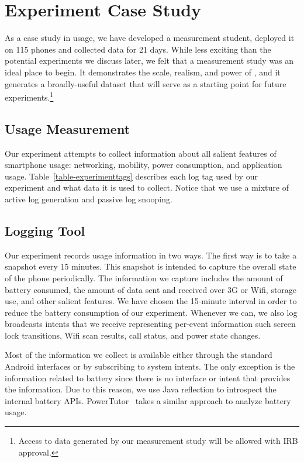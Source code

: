 \section{Experiment Case Study}
\label{sec-experiment}

As a case study in \PhoneLab{} usage, we have developed a measurement
student, deployed it on 115 phones and collected data for 21 days. While less
exciting than the potential experiments we discuss later, we felt that a
measurement study was an ideal place to begin. It demonstrates the scale,
realism, and power of \PhoneLab{}, and it generates a broadly-useful dataset
that will serve as a starting point for future experiments.\footnote{Access
to data generated by our measurement study will be allowed with IRB
approval.}

\subsection{Usage Measurement}

Our experiment attempts to collect information about all salient features of
smartphone usage: networking, mobility, power consumption, and application
usage. Table~\ref{table-experimenttags} describes each log tag used by our
experiment and what data it is used to collect. Notice that we use a mixture
of active log generation and passive log snooping.

\subsection{Logging Tool}

Our experiment records usage information in two ways. The first way is to
take a snapshot every 15 minutes. This snapshot is intended to capture the
overall state of the phone periodically. The information we capture includes
the amount of battery consumed, the amount of data sent and received over 3G
or Wifi, storage use, and other salient features. We have chosen the
15-minute interval in order to reduce the battery consumption of our
experiment. Whenever we can, we also log broadcasts intents that we receive
representing per-event information such screen lock transitions, Wifi scan
results, call status, and power state changes.

Most of the information we collect is available either through the standard
Android interfaces or by subscribing to system intents. The only exception is the
information related to battery since there is no interface or intent that provides
the information. Due to this reason, we use Java reflection to introspect the
internal battery APIs. PowerTutor~\cite{zhang:codes:2010} takes a similar
approach to analyze battery usage.


